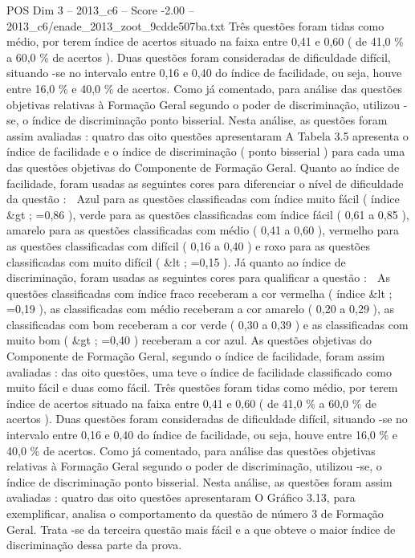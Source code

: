\begin{textsample}{POS Dim 3 – 2013\_c6 – Score -2.00 – 2013\_c6/enade\_2013\_zoot\_9cdde507ba.txt}
Três questões foram tidas como médio, por terem índice de acertos situado na faixa entre 0,41 e 0,60 ( de 41,0 \% a 60,0 \% de acertos ).
Duas questões foram consideradas de dificuldade difícil, situando -se no intervalo entre 0,16 e 0,40 do índice de facilidade, ou seja, houve entre 16,0 \% e 40,0 \% de acertos.
Como já comentado, para análise das questões objetivas relativas à Formação Geral segundo o poder de discriminação, utilizou -se, o índice de discriminação ponto bisserial.
Nesta análise, as questões foram assim avaliadas : quatro das oito questões apresentaram A Tabela 3.5 apresenta o índice de facilidade e o índice de discriminação ( ponto bisserial ) para cada uma das questões objetivas do Componente de Formação Geral.
Quanto ao índice de facilidade, foram usadas as seguintes cores para diferenciar o nível de dificuldade da questão :  Azul para as questões classificadas com índice muito fácil ( índice \&gt ; =0,86 ), verde para as questões classificadas com índice fácil ( 0,61 a 0,85 ), amarelo para as questões classificadas com médio ( 0,41 a 0,60 ), vermelho para as questões classificadas com difícil ( 0,16 a 0,40 ) e roxo para as questões classificadas com muito difícil ( \&lt ; =0,15 ).
Já quanto ao índice de discriminação, foram usadas as seguintes cores para qualificar a questão :  As questões classificadas com índice fraco receberam a cor vermelha ( índice \&lt ; =0,19 ), as classificadas com médio receberam a cor amarelo ( 0,20 a 0,29 ), as classificadas com bom receberam a cor verde ( 0,30 a 0,39 ) e as classificadas com muito bom ( \&gt ; =0,40 ) receberam a cor azul.
As questões objetivas do Componente de Formação Geral, segundo o índice de facilidade, foram assim avaliadas : das oito questões, uma teve o índice de facilidade classificado como muito fácil e duas como fácil.
Três questões foram tidas como médio, por terem índice de acertos situado na faixa entre 0,41 e 0,60 ( de 41,0 \% a 60,0 \% de acertos ).
Duas questões foram consideradas de dificuldade difícil, situando -se no intervalo entre 0,16 e 0,40 do índice de facilidade, ou seja, houve entre 16,0 \% e 40,0 \% de acertos.
Como já comentado, para análise das questões objetivas relativas à Formação Geral segundo o poder de discriminação, utilizou -se, o índice de discriminação ponto bisserial.
Nesta análise, as questões foram assim avaliadas : quatro das oito questões apresentaram O Gráfico 3.13, para exemplificar, analisa o comportamento da questão de número 3 de Formação Geral.
Trata -se da terceira questão mais fácil e a que obteve o maior índice de discriminação dessa parte da prova.

\end{textsample}
